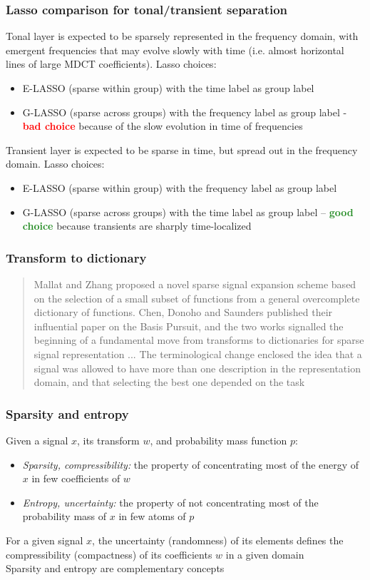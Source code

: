 \documentclass[usenames,dvipsnames]{beamer}
\begin{document}
\begin{frame}
	\frametitle{Lasso comparison for tonal/transient separation}
	Tonal layer is expected to be sparsely represented in the frequency domain, with emergent frequencies that may evolve slowly with time (i.e. almost horizontal lines of large MDCT coefficients). Lasso choices:
	\begin{itemize}
		\item
			E-LASSO (sparse within group) with the time label as group label
		\item
			G-LASSO (sparse across groups) with the frequency label as group label - \textcolor{red}{\textbf{bad choice}} because of the slow evolution in time of frequencies
	\end{itemize}
	Transient layer is expected to be sparse in time, but spread out in the frequency domain. Lasso choices:
	\begin{itemize}
		\item
			E-LASSO (sparse within group) with the frequency label as group label
		\item
			G-LASSO (sparse across groups) with the time label as group label -- \textcolor{ForestGreen}{\textbf{good choice}} because transients are sharply time-localized
	\end{itemize}
\end{frame}

\begin{frame}
	\frametitle{Transform to dictionary} 
	\begin{quote}
		Mallat and Zhang proposed a novel sparse signal expansion scheme based on the selection of a small subset of functions from a general overcomplete dictionary of functions. Chen, Donoho and Saunders published their influential paper on the Basis Pursuit, and the two works signalled the beginning of a fundamental move from transforms to dictionaries for sparse signal representation ... The terminological change enclosed the idea that a signal was allowed to have more than one description in the representation domain, and that selecting the best one depended on the task
	\end{quote}
\end{frame}

\begin{frame}
	\frametitle{Sparsity and entropy} 
	Given a signal $x$, its transform $w$, and probability mass function $p$:
	\begin{itemize}
		\item
			\textit{Sparsity, compressibility:} the property of concentrating most of the energy of $x$ in few coefficients of $w$
		\item
			\textit{Entropy, uncertainty:} the property of not concentrating most of the probability mass of $x$ in few atoms of $p$
	\end{itemize}
	For a given signal $x$, the uncertainty (randomness) of its elements defines the compressibility (compactness) of its coefficients $w$ in a given domain\\

	Sparsity and entropy are complementary concepts
\end{frame}
\end{document}
